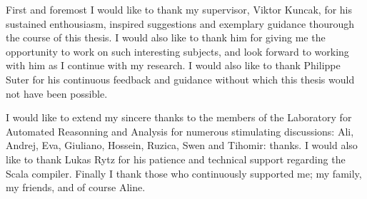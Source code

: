 First and foremost I would like to thank my supervisor, Viktor Kuncak, for his
sustained enthousiasm, inspired suggestions and exemplary guidance thourough
the course of this thesis. I would also like to thank him for giving me the
opportunity to work on such interesting subjects, and look forward to working
with him as I continue with my research. I would also like to thank Philippe
Suter for his continuous feedback and guidance without which this thesis would
not have been possible.

I would like to extend my sincere thanks to the members of the Laboratory for
Automated Reasonning and Analysis for numerous stimulating discussions: Ali,
Andrej, Eva, Giuliano, Hossein, Ruzica, Swen and Tihomir: thanks. I would also
like to thank Lukas Rytz for his patience and technical support regarding the
Scala compiler. Finally I thank those who continuously supported me; my
family, my friends, and of course Aline.

